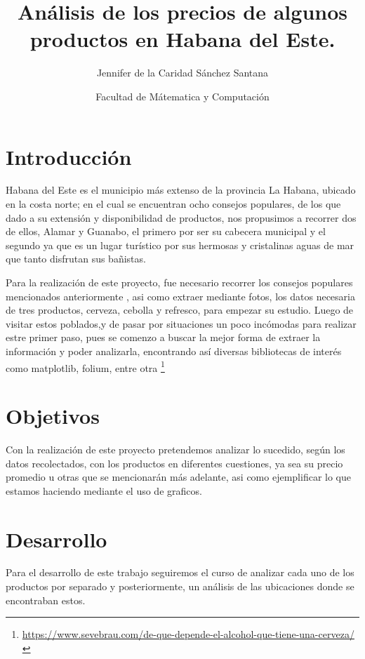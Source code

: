 \documentclass[a4paper,11pt]{article}
\title{Análisis de los precios de algunos productos en Habana del Este.}
\author{Jennifer de la Caridad Sánchez Santana}
\date{Facultad de Mátematica y Computación}
\begin{document}
\newpage

\maketitle
\tableofcontents

\newpage

\section{Introducción}

Habana del Este es el municipio más extenso de la provincia La Habana, ubicado en la costa norte; en el cual se encuentran ocho consejos populares, de los que dado a su extensión y disponibilidad de productos, nos propusimos a recorrer dos de ellos, Alamar y Guanabo, el primero por ser su cabecera municipal y el segundo ya que es un lugar turístico por sus hermosas y cristalinas aguas de mar que tanto disfrutan sus bañistas.
\par\vspace{1pt}
Para la realización de este proyecto, fue necesario recorrer los consejos populares mencionados anteriormente , asi como extraer mediante fotos, los datos necesaria de tres productos, cerveza, cebolla y refresco, para empezar su estudio. Luego de visitar estos poblados,y de pasar por situaciones un poco incómodas para realizar estre primer paso, pues se comenzo a buscar la mejor forma de extraer la información y poder analizarla, encontrando así diversas bibliotecas de interés como matplotlib, folium, entre otra
 \footnote{\href{https://www.sevebrau.com/de-que-depende-el-alcohol-que-tiene-una-cerveza/}{https://www.sevebrau.com/de-que-depende-el-alcohol-que-tiene-una-cerveza/}}
\section{Objetivos}
Con la realización de este proyecto pretendemos analizar lo sucedido, según los datos recolectados,
con los productos en diferentes cuestiones, ya sea su precio promedio u otras que se mencionarán más adelante, asi como ejemplificar lo que estamos haciendo mediante el uso de graficos.

\section{Desarrollo}
Para el desarrollo de este trabajo seguiremos el curso de analizar cada uno de los productos por separado y posteriormente, un análisis de las ubicaciones donde se encontraban estos.
\end{document}
